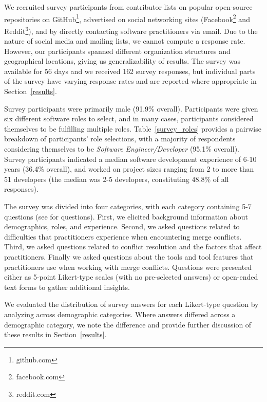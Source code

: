 \renewcommand*{\thefootnote}{\arabic{footnote}}
\setcounter{footnote}{0}
We recruited survey participants from contributor lists on popular open-source repositories on GitHub\footnote{github.com}, advertised on social networking sites (Facebook\footnote{facebook.com} and Reddit\footnote{reddit.com}), and by directly contacting software practitioners via email. 
Due to the nature of social media and mailing lists, we cannot compute a response rate. 
However, our participants spanned different organization structures and geographical locations, giving us generalizability of results.
The survey was available for 56 days and we received 162 survey responses, but individual parts of the survey have varying response rates and are reported where appropriate in Section~\ref{results}.


Survey participants were primarily male (91.9\% overall). 
Participants were given six different software roles to select, and in many cases, participants considered themselves to be fulfilling multiple roles. 
Table~\ref{survey_roles} provides a pairwise breakdown of participants' role selections, with a majority of respondents considering themselves to be \textit{Software Engineer/Developer} (95.1\% overall).
Survey participants indicated a median software development experience of 6-10 years (36.4\% overall), and worked on project sizes ranging from 2 to more than 51 developers (the median was 2-5 developers, constituting 48.8\% of all responses).

The survey was divided into four categories, with each category containing 5-7 questions (see \cite{companion_site} for questions).
First, we elicited background information about demographics, roles, and experience.
Second, we asked questions related to difficulties that practitioners experience when encountering merge conflicts.
Third, we asked questions related to conflict resolution and the factors that affect practitioners.
Finally we asked questions about the tools and tool features that practitioners use when working with merge conflicts.
Questions were presented either as 5-point Likert-type scales (with no pre-selected answers) or open-ended text forms to gather additional insights.

 We evaluated the distribution of survey answers for each Likert-type question by analyzing across demographic categories.
Where answers differed across a demographic category, we note the difference and provide further discussion of these results in Section~\ref{results}.

